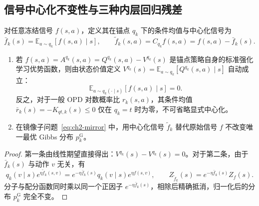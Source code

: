 \documentclass[lang=cn,scheme=chinese,openany]{elegantbook}
\begin{document}
\subsection{信号中心化不变性与三种内层回归残差}

\begin{definition}[锚点条件中心化信号]
\label{def:ch2-centered-signal}
对任意冻结信号 $f(s,a)$，定义其在锚点 $q_k$ 下的条件均值与中心化信号为
\begin{equation*}
\bar f_k(s)=\mathbb E_{a\sim q_k}[f(s,a)\mid s],
\qquad
\widetilde f_k(s,a)=C_{q_k}f(s,a)=f(s,a)-\bar f_k(s).
\end{equation*}
\end{definition}

\begin{proposition}
\label{prop:ch2-advantage-centering}
\label{prop:ch2-centering}
\begin{enumerate}
\item 若 $f(s,a)=A^{ q_k}(s,a)=Q^{q_k}(s,a)-V^{q_k}(s)$ 是锚点策略自身的标准强化学习优势函数，则由状态价值定义 $V^{q_k}(s)=\mathbb E_{a\sim q_k}[Q^{q_k}(s,a)\mid s]$ 自动成立：
\begin{equation}
\label{eq:ch2-advantage-zero-mean}
\mathbb E_{a\sim q_k(\cdot\mid s)}[f(s,a)\mid s]=0.
\end{equation}
反之，对于一般 OPD 对数概率比 $r_k(s,a)$，其条件均值 $\bar r_k(s)=-K_{qt,k}(s)\le 0$ 仅在 $q_k=t$ 时为零，不可省略显式中心化。
\item 在镜像子问题~\eqref{eq:ch2-mirror} 中，用中心化信号 $\widetilde f_k$ 替代原始信号 $f$ 不改变唯一最优 Gibbs 分布 $p_k^{\mathrm G}$。
\end{enumerate}
\end{proposition}
\begin{proof}
第一条由线性期望直接得出：$V^{q_k}(s)-V^{q_k}(s)=0$。对于第二条，由于 $\bar f_k(s)$ 与动作 $v$ 无关，有
\begin{equation*}
 q_k(v\mid s)e^{\eta\widetilde f_k(s,v)}
=e^{-\eta\bar f_k(s)} q_k(v\mid s)e^{\eta f(s,v)},
\qquad
Z_{\widetilde f_k}(s)=e^{-\eta\bar f_k(s)}Z_f(s).
\end{equation*}
分子与配分函数同时乘以同一个正因子 $e^{-\eta\bar f_k(s)}$，相除后精确抵消，归一化后的分布 $p_k^{\mathrm G}$ 完全不变。
\end{proof}
\end{document}

